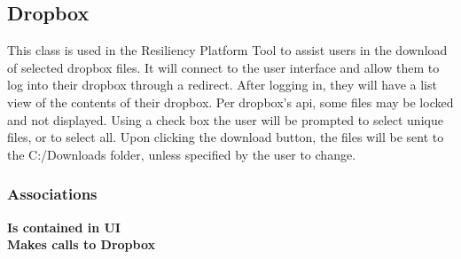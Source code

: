 \subsection{Dropbox}
This class is used in the Resiliency Platform Tool to assist users in the download of selected dropbox files.
It will connect to the user interface and allow them to log into their dropbox through a redirect. After logging
in, they will have a list view of the contents of their dropbox. Per dropbox's api, some files may be locked and 
not displayed. Using a check box the user will be prompted to select unique files, or to select all. Upon clicking 
the download button, the files will be sent to the C:/Downloads folder, unless specified by the user to change.

\subsubsection{Associations}
\textbf{Is contained in UI} \\

\textbf{Makes calls to Dropbox} \\


